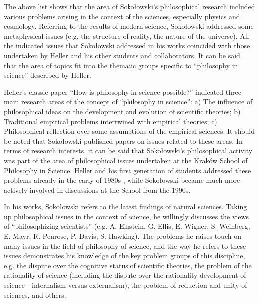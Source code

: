 \documentclass[%
  manuscript=article,
  year=2024,
  volume=77,
  doi=00000.000,
]{zfn}
\begin{document}
The above list shows that the area of Sokołowski's philosophical research included various problems arising in the context of the sciences, especially physics and cosmology. Referring to the results of modern science, Sokołowski addressed some metaphysical issues (e.g. the structure of reality, the nature of the universe). All the indicated issues that Sokołowski addressed in his works coincided with those undertaken by Heller and his other students and collaborators. It can be said that the area of topics fit into the thematic groups specific to ``philosophy in science'' described by Heller.



Heller's classic paper ``How is philosophy in science possible?'' 
\parencites[][]{Heller1986Jak}[][]{Heller2019How} %
 indicated three main research areas of the concept of ``philosophy in science'': a) The influence of philosophical ideas on the development and evolution of scientific theories; b) Traditional empirical problems intertwined with empirical theories; c) Philosophical reflection over some assumptions of the empirical sciences. It should be noted that Sokołowski published papers on issues related to these areas. In terms of research interests, it can be said that Sokołowski's philosophical activity was part of the area of philosophical issues undertaken at the Kraków School of Philosophy in Science. Heller and his first generation of students addressed these problems already in the early of 1980s 
\parencite[][p.222]{Trombik2021Koncepcje}, %
 while Sokołowski became much more actively involved in discussions at the School from the 1990s.



In his works, Sokołowski refers to the latest findings of natural sciences. Taking up philosophical issues in the context of science, he willingly discusses the views of ``philosophizing scientists'' (e.g. A. Einstein, G. Ellis, E. Wigner, S. Weinberg, E. Mayr, R. Penrose, P. Davis, S. Hawking). The problems he raises touch on many issues in the field of philosophy of science, and the way he refers to these issues demonstrates his knowledge of the key problem groups of this discipline, e.g. the dispute over the cognitive status of scientific theories, the problem of the rationality of science (including the dispute over the rationality development of science---internalism versus externalism), the problem of reduction and unity of sciences, and others.
\end{document}
